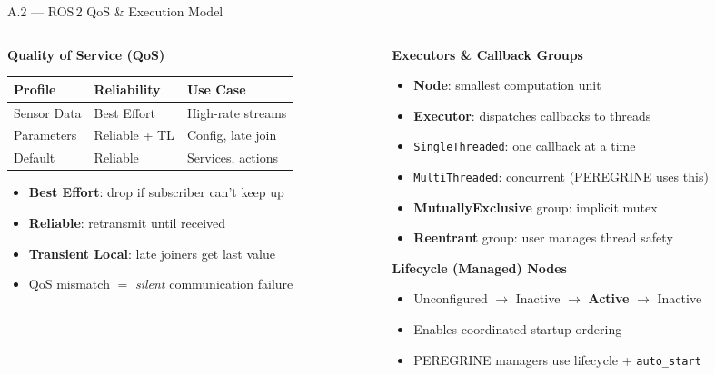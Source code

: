 \documentclass[aspectratio=169, 10pt]{beamer}
\begin{document}
\begin{frame}{A.2 --- ROS\,2 QoS \& Execution Model}
\begin{columns}[T]
\begin{column}{0.48\textwidth}
\textbf{Quality of Service (QoS)}

\vspace{0.3em}
\small
\begin{tabular}{@{}lll@{}}
\toprule
\textbf{Profile} & \textbf{Reliability} & \textbf{Use Case} \\
\midrule
Sensor Data & Best Effort & High-rate streams \\
Parameters & Reliable + TL & Config, late join \\
Default & Reliable & Services, actions \\
\bottomrule
\end{tabular}

\vspace{0.3em}
\begin{itemize}\scriptsize
  \item \textbf{Best Effort}: drop if subscriber can't keep up
  \item \textbf{Reliable}: retransmit until received
  \item \textbf{Transient Local}: late joiners get last value
  \item QoS mismatch $=$ \emph{silent} communication failure
\end{itemize}
\end{column}

\begin{column}{0.48\textwidth}
\textbf{Executors \& Callback Groups}
\begin{itemize}\small
  \item \textbf{Node}: smallest computation unit
  \item \textbf{Executor}: dispatches callbacks to threads
  \item \texttt{SingleThreaded}: one callback at a time
  \item \texttt{MultiThreaded}: concurrent (PEREGRINE uses this)
  \item \textbf{MutuallyExclusive} group: implicit mutex
  \item \textbf{Reentrant} group: user manages thread safety
\end{itemize}

\vspace{0.3em}
\textbf{Lifecycle (Managed) Nodes}
\begin{itemize}\scriptsize
  \item Unconfigured $\to$ Inactive $\to$ \textbf{Active} $\to$ Inactive
  \item Enables coordinated startup ordering
  \item PEREGRINE managers use lifecycle + \texttt{auto\_start}
\end{itemize}
\end{column}
\end{columns}
\end{frame}
\end{document}
